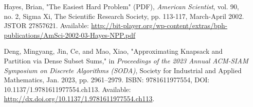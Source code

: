 \begin{thebibliography}{99}


Hayes, Brian, "The Easiest Hard Problem" (PDF), \emph{American Scientist}, vol. 90, no. 2, Sigma Xi, The Scientific Research Society, pp. 113-117, March-April 2002. JSTOR 27857621. Available: \url{http://bit-player.org/wp-content/extras/bph-publications/AmSci-2002-03-Hayes-NPP.pdf}

Deng, Mingyang, Jin, Ce, and Mao, Xiao, "Approximating Knapsack and Partition via Dense Subset Sums," in \emph{Proceedings of the 2023 Annual ACM-SIAM Symposium on Discrete Algorithms (SODA)}, Society for Industrial and Applied Mathematics, Jan. 2023, pp. 2961–2979. ISBN: 9781611977554, DOI: 10.1137/1.9781611977554.ch113. Available: \url{http://dx.doi.org/10.1137/1.9781611977554.ch113}.

\end{thebibliography}
    